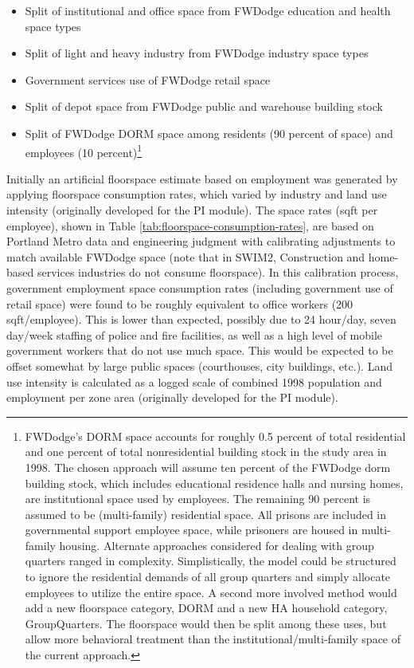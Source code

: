 \begin{itemize}
\item Split of institutional and office space from FWDodge education and health space types
\item Split of light and heavy industry from FWDodge industry space types
\item Government services use of FWDodge retail space
\item Split of depot space from FWDodge public and warehouse building stock
\item Split of FWDodge DORM space among residents (90 percent of space) and employees (10 percent)\footnote{FWDodge's DORM space accounts for roughly 0.5 percent of total residential and one percent of total nonresidential building stock in the study area in 1998. The chosen approach will assume ten percent of the FWDodge dorm building stock, which includes educational residence halls and nursing homes, are institutional space used by employees. The remaining 90 percent is assumed to be (multi-family) residential space. All prisons are included in governmental support employee space, while prisoners are housed in multi-family housing. Alternate approaches considered for dealing with group quarters ranged in complexity. Simplistically, the model could be structured to ignore the residential demands of all group quarters and simply allocate employees to utilize the entire space. A second more involved method would add a new floorspace category, DORM and a new HA household category, GroupQuarters. The floorspace would then be split among these uses, but allow more behavioral treatment than the institutional/multi-family space of the current approach.}
\end{itemize}

Initially an artificial floorspace estimate based on employment was generated by applying floorspace consumption rates, which varied by industry and land use intensity (originally developed for the PI module). The space rates (sqft per employee), shown in Table \ref{tab:floorspace-consumption-rates}, are based on Portland Metro data and engineering judgment with calibrating adjustments to match available FWDodge space (note that in SWIM2, Construction and home-based services industries do not consume floorspace). In this calibration process, government employment space consumption rates (including government use of retail space) were found to be roughly equivalent to office workers (200 sqft/employee). This is lower than expected, possibly due to 24 hour/day, seven day/week staffing of police and fire facilities, as well as a high level of mobile government workers that do not use much space. This would be expected to be offset somewhat by large public spaces (courthouses, city buildings, etc.). Land use intensity is calculated as a logged scale of combined 1998 population and employment per zone area (originally developed for the PI module). 

